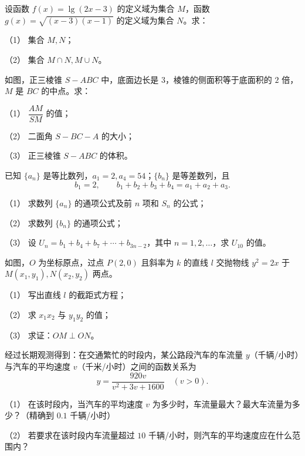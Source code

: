 \begin{question}
设函数 $f(x)=\lg(2x-3)$ 的定义域为集合 $M$，函数 $g(x)=\sqrt{(x-3)(x-1)}$ 的定义域为集合 $N$。求：

（1） 集合 $M,N$；

（2） 集合 $M\cap N,M\cup N$。

\Needspace{0.4\textheight}
\end{question}
\begin{question}
如图，正三棱锥 $S-ABC$ 中，底面边长是 $3$，棱锥的侧面积等于底面积的 $2$ 倍，$M$ 是 $BC$ 的中点。求：

（1） $\dfrac{AM}{SM}$ 的值；

（2） 二面角 $S-BC-A$ 的大小；

（3） 正三棱锥 $S-ABC$ 的体积。
\nopagebreak[4]
\begin{center}\end{center}
\nopagebreak[4]
\end{question}
\begin{question}
已知 $\{a_n\}$ 是等比数列，$a_1=2,a_4=54$；$\{b_n\}$ 是等差数列，且
\nopagebreak[4]
\[
b_1=2,\qquad b_1+b_2+b_3+b_4=a_1+a_2+a_3.
\]

（1） 求数列 $\{a_n\}$ 的通项公式及前 $n$ 项和 $S_n$ 的公式；

（2） 求数列 $\{b_n\}$ 的通项公式；

（3） 设 $U_n=b_1+b_4+b_7+\cdots+b_{3n-2}$，其中 $n=1,2,\ldots$，求 $U_{10}$ 的值。

\Needspace{0.4\textheight}
\end{question}
\begin{question}
如图，$O$ 为坐标原点，过点 $P(2,0)$ 且斜率为 $k$ 的直线 $l$ 交抛物线 $y^2=2x$ 于 $M(x_1,y_1),N(x_2,y_2)$ 两点。

（1） 写出直线 $l$ 的截距式方程；

（2） 求 $x_1x_2$ 与 $y_1y_2$ 的值；

（3） 求证：$OM\perp ON$。
\nopagebreak[4]
\begin{center}\end{center}
\nopagebreak[4]
\end{question}
\begin{question}
经过长期观测得到：在交通繁忙的时段内，某公路段汽车的车流量 $y$（千辆/小时）与汽车的平均速度 $v$（千米/小时）之间的函数关系为
\nopagebreak[4]
\[
y=\frac{920v}{v^2+3v+1600}\quad(v>0).
\]

（1） 在该时段内，当汽车的平均速度 $v$ 为多少时，车流量最大？最大车流量为多少？（精确到 $0.1$ 千辆/小时）

（2） 若要求在该时段内车流量超过 $10$ 千辆/小时，则汽车的平均速度应在什么范围内？

\end{question}
